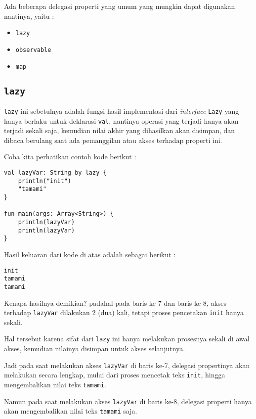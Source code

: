 Ada beberapa delegasi properti yang umum yang mungkin dapat digunakan nantinya, yaitu :

\begin{itemize}
	\item \texttt{lazy}
	\item \texttt{observable}
	\item \texttt{map}
\end{itemize}

\subsection{\texttt{lazy}}

\texttt{lazy} ini sebetulnya adalah fungsi hasil implementasi dari \textit{interface} \texttt{Lazy} yang hanya berlaku untuk deklarasi \texttt{val}, nantinya operasi yang terjadi hanya akan terjadi sekali saja, kemudian nilai akhir yang dihasilkan akan disimpan, dan dibaca berulang saat ada pemanggilan atau akses terhadap properti ini. 

Coba kita perhatikan contoh kode berikut :

\begin{lstlisting}
val lazyVar: String by lazy {
	println("init")
	"tamami"
}

fun main(args: Array<String>) {
	println(lazyVar)
	println(lazyVar)
}
\end{lstlisting}

Hasil keluaran dari kode di atas adalah sebagai berikut :

\begin{lstlisting}
init
tamami
tamami
\end{lstlisting}

Kenapa hasilnya demikian? padahal pada baris ke-7 dan baris ke-8, akses terhadap \texttt{lazyVar} dilakukan 2 (dua) kali, tetapi proses pencetakan \texttt{init} hanya sekali.

Hal tersebut karena sifat dari \texttt{lazy} ini hanya melakukan prosesnya sekali di awal akses, kemudian nilainya disimpan untuk akses selanjutnya. 

Jadi pada saat melakukan akses \texttt{lazyVar} di baris ke-7, delegasi propertinya akan melakukan secara lengkap, mulai dari proses mencetak teks \texttt{init}, hingga mengembalikan nilai teks \texttt{tamami}. 

Namun pada saat melakukan akses \texttt{lazyVar} di baris ke-8, delegasi properti hanya akan mengembalikan nilai teks \texttt{tamami} saja.


